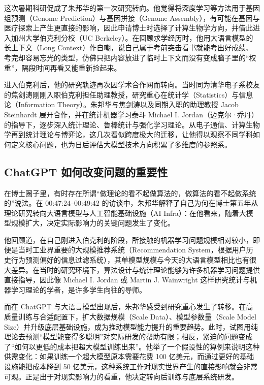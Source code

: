 \documentclass[UTF8,a4paper,11pt,fontset=fandol]{ctexart}
\begin{document}
这次暑期科研促成了朱邦华的第一次研究转向。他觉得将深度学习等方法用于基因组预测（Genome Prediction）与基因拼接（Genome Assembly），有可能在基因与医疗探索上产生更直接的影响，因此申请博士时选择了计算生物学方向，并借此进入加州大学伯克利分校（UC Berkeley）。在回顾求学经历时，他用大语言模型的长上下文（Long Context）作自嘲，说自己属于考前突击看书就能考出好成绩、考完却容易忘光的类型，仿佛只把内容放进了临时上下文而没有变成脑子里的“权重”，隔段时间再看又能重新捡起来。

进入伯克利后，他的研究轨迹再次因学术合作网而转向。当时同为清华电子系校友的焦剑涛刚刚入职伯克利担任助理教授，研究重心在统计学（Statistics）与信息论（Information Theory）。朱邦华与焦剑涛以及同期入职的助理教授 Jacob Steinhardt 展开合作，并在统计机器学习泰斗 Michael I. Jordan（迈克尔·乔丹）的指导下，逐步深入统计理论、鲁棒统计与强化学习理论。从电子通信、计算生物学再到统计理论与博弈论，这几次看似跨度极大的迁移，让他得以观察不同学科如何定义核心问题，也为日后评估大模型技术方向积累了多维度的参照系。

\subsection{ChatGPT 如何改变问题的重要性}
在博士圈子里，有时存在所谓“做理论的看不起做算法的，做算法的看不起做系统的”说法。在 00:47:24–00:49:42 的访谈中，朱邦华解释了自己为何在博士第五年从理论研究转向大语言模型与人工智能基础设施（AI Infra）：在他看来，随着大模型规模扩大，决定实际影响力的关键问题发生了变化。

他回顾道，在自己刚进入伯克利的阶段，所接触的机器学习问题规模相对较小，即便是当时工业界重要的大规模推荐系统（Recommendation System，根据用户历史行为预测偏好的信息过滤系统），其单模型规模与今天的大语言模型相比也有很大差异。在当时的研究环境下，算法设计与统计理论能够为许多机器学习问题提供直接指导，因此像 Michael I. Jordan 或 Martin J. Wainwright 这样研究统计与机器学习理论的学者，是许多学生向往的导师。

而在 ChatGPT 与大语言模型出现后，朱邦华感受到研究重心发生了转移。在高质量训练与合适配置下，扩大数据规模（Scale Data）、模型参数量（Scale Model Size）并升级底层基础设施，成为推动模型能力提升的重要趋势。此时，试图用纯理论去预测“模型能变得多聪明”对实际研发的帮助有限；相反，紧迫的问题变成了“如何以更低的成本把超大模型训练出来”。他举了一个假设性的算例来说明这种供需变化：如果训练一个超大模型原本需要花费 100 亿美元，而通过更好的基础设施能把成本降到 50 亿美元，这种系统工作对现实世界产生的直接影响就会非常可观。正是出于对现实影响力的看重，他决定转向后训练与底层系统研发。
\end{document}
